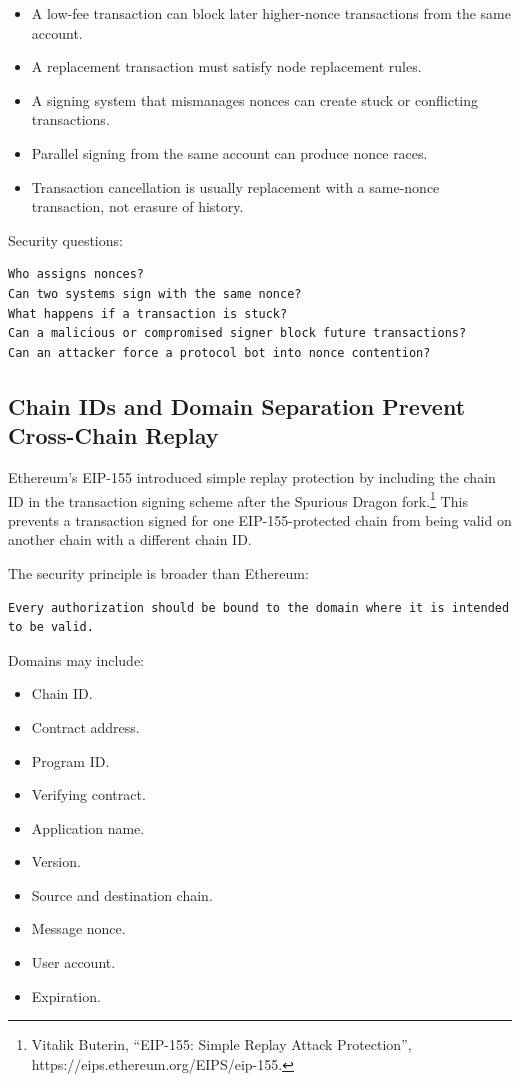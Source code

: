 \begin{itemize}
\tightlist
\item
  A low-fee transaction can block later higher-nonce transactions from
  the same account.
\item
  A replacement transaction must satisfy node replacement rules.
\item
  A signing system that mismanages nonces can create stuck or
  conflicting transactions.
\item
  Parallel signing from the same account can produce nonce races.
\item
  Transaction cancellation is usually replacement with a same-nonce
  transaction, not erasure of history.
\end{itemize}

Security questions:

\begin{lstlisting}
Who assigns nonces?
Can two systems sign with the same nonce?
What happens if a transaction is stuck?
Can a malicious or compromised signer block future transactions?
Can an attacker force a protocol bot into nonce contention?
\end{lstlisting}

\subsection{Chain IDs and Domain Separation Prevent Cross-Chain Replay}

Ethereum's EIP-155 introduced simple replay protection by including the
chain ID in the transaction signing scheme after the Spurious Dragon
fork.\footnote{Vitalik Buterin, ``EIP-155: Simple Replay Attack
  Protection'', https://eips.ethereum.org/EIPS/eip-155.} This prevents a
transaction signed for one EIP-155-protected chain from being valid on
another chain with a different chain ID.

The security principle is broader than Ethereum:

\begin{lstlisting}
Every authorization should be bound to the domain where it is intended to be valid.
\end{lstlisting}

Domains may include:

\begin{itemize}
\tightlist
\item
  Chain ID.
\item
  Contract address.
\item
  Program ID.
\item
  Verifying contract.
\item
  Application name.
\item
  Version.
\item
  Source and destination chain.
\item
  Message nonce.
\item
  User account.
\item
  Expiration.
\end{itemize}

